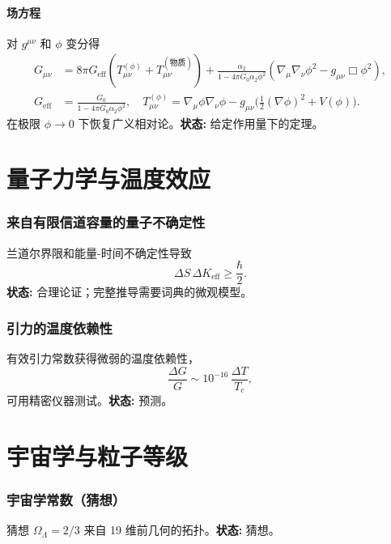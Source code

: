 \documentclass[11pt,a4paper]{article}
\begin{document}
	\subsection{场方程}
	对 \(g^{\mu\nu}\) 和 \(\phi\) 变分得
	\begin{align}
		G_{\mu\nu} &= 8\pi G_{\mathrm{eff}}\left(T_{\mu\nu}^{(\phi)} + T_{\mu\nu}^{(\text{物质})}\right) + \frac{\alpha_2}{1-4\pi G_0\alpha_2\phi^2}\left(\nabla_\mu\nabla_\nu\phi^2 - g_{\mu\nu}\Box\phi^2\right), \label{eq:einstein-mod} \\
		G_{\mathrm{eff}} &= \frac{G_0}{1-4\pi G_0\alpha_2\phi^2},\quad
		T_{\mu\nu}^{(\phi)} = \nabla_\mu\phi\nabla_\nu\phi - g_{\mu\nu}\bigl(\tfrac12(\nabla\phi)^2 + V(\phi)\bigr).
	\end{align}
	在极限 \(\phi\to0\) 下恢复广义相对论。\textbf{状态:} 给定作用量下的定理。
	
	\part{量子力学与温度效应}
	
	\section{来自有限信道容量的量子不确定性}
	兰道尔界限和能量-时间不确定性导致
	\[
	\Delta S \, \Delta K_{\mathrm{eff}} \ge \frac{\hbar}{2}.
	\]
	\textbf{状态:} 合理论证；完整推导需要词典的微观模型。
	
	\section{引力的温度依赖性}
	\label{sec:temperature}
	有效引力常数获得微弱的温度依赖性，
	\[
	\frac{\Delta G}{G} \sim 10^{-16}\,\frac{\Delta T}{T_c},
	\]
	可用精密仪器测试。\textbf{状态:} 预测。
	
	\part{宇宙学与粒子等级}
	
	\section{宇宙学常数（猜想）}
	\label{sec:Lambda}
	猜想 \(\Omega_\Lambda = 2/3\) 来自 19 维前几何的拓扑。\textbf{状态:} 猜想。
	
\end{document}
